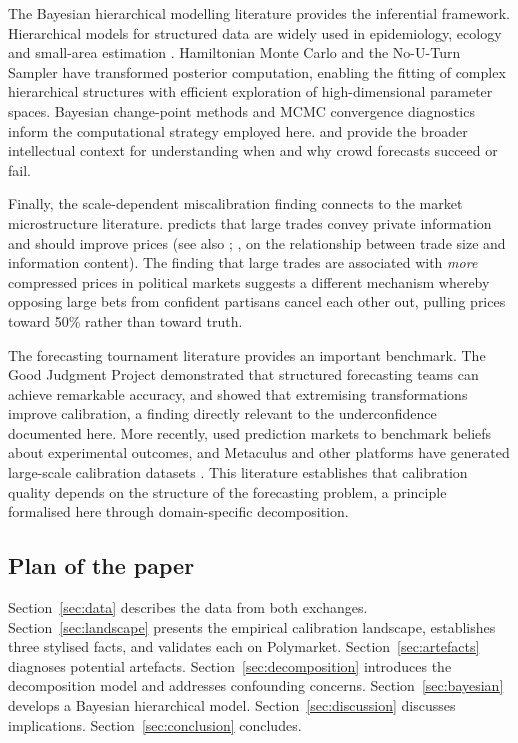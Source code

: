 \documentclass[numsec,webpdf,modern,medium]{oup-authoring-template}
\theoremstyle{thmstyleone}%
\theoremstyle{thmstyletwo}%
\theoremstyle{thmstylethree}%
\begin{document}
The Bayesian hierarchical modelling literature provides the inferential framework. Hierarchical models for structured data are widely used in epidemiology, ecology and small-area estimation \citep{gelman2013bayesian,hogg2024two,gelman2007data}. Hamiltonian Monte Carlo \citep{neal2011mcmc,betancourt2017conceptual} and the No-U-Turn Sampler \citep{hoffman2014nouturn} have transformed posterior computation, enabling the fitting of complex hierarchical structures with efficient exploration of high-dimensional parameter spaces. Bayesian change-point methods \citep{assareh2013bayesian} and MCMC convergence diagnostics \citep{mengersen1999mcmc,brooks1998general} inform the computational strategy employed here. \citet{tetlock2005expert} and \citet{tetlock2015superforecasting} provide the broader intellectual context for understanding when and why crowd forecasts succeed or fail.

Finally, the scale-dependent miscalibration finding connects to the market microstructure literature. \citet{kyle1985continuous} predicts that large trades convey private information and should improve prices (see also \citealp{glosten1985bid}; \citealp{easley1987price}, on the relationship between trade size and information content). The finding that large trades are associated with \emph{more} compressed prices in political markets suggests a different mechanism whereby opposing large bets from confident partisans cancel each other out, pulling prices toward 50\% rather than toward truth.

The forecasting tournament literature provides an important benchmark. The Good Judgment Project \citep{mellers2014psychological} demonstrated that structured forecasting teams can achieve remarkable accuracy, and \citet{baron2014two} showed that extremising transformations improve calibration, a finding directly relevant to the underconfidence documented here. More recently, \citet{dellavigna2018predicting} used prediction markets to benchmark beliefs about experimental outcomes, and Metaculus and other platforms have generated large-scale calibration datasets \citep{karger2023reciprocal}. This literature establishes that calibration quality depends on the structure of the forecasting problem, a principle formalised here through domain-specific decomposition.
\subsection{Plan of the paper}\label{sec:plan}

Section~\ref{sec:data} describes the data from both exchanges. Section~\ref{sec:landscape} presents the empirical calibration landscape, establishes three stylised facts, and validates each on Polymarket. Section~\ref{sec:artefacts} diagnoses potential artefacts. Section~\ref{sec:decomposition} introduces the decomposition model and addresses confounding concerns. Section~\ref{sec:bayesian} develops a Bayesian hierarchical model. Section~\ref{sec:discussion} discusses implications. Section~\ref{sec:conclusion} concludes.
\end{document}
